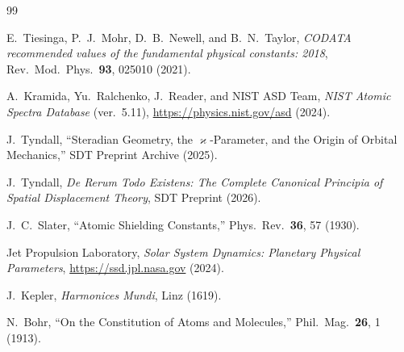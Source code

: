 \documentclass[twocolumn,epjc3]{svjour3}
\newcommand{\kop}{\varkappa}  %
\begin{document}
\begin{thebibliography}{99}

E.~Tiesinga, P.~J.~Mohr, D.~B.~Newell, and B.~N.~Taylor,
\emph{CODATA recommended values of the fundamental physical constants: 2018},
Rev.\ Mod.\ Phys.\ \textbf{93}, 025010 (2021).

A.~Kramida, Yu.~Ralchenko, J.~Reader, and NIST ASD Team,
\emph{NIST Atomic Spectra Database} (ver.\ 5.11),
\url{https://physics.nist.gov/asd} (2024).

J.~Tyndall,
``Steradian Geometry, the $\kop$-Parameter, and the Origin of Orbital Mechanics,''
SDT Preprint Archive (2025).

J.~Tyndall,
\emph{De Rerum Todo Existens: The Complete Canonical Principia of Spatial Displacement Theory},
SDT Preprint (2026).

J.~C.~Slater,
``Atomic Shielding Constants,''
Phys.\ Rev.\ \textbf{36}, 57 (1930).

Jet Propulsion Laboratory,
\emph{Solar System Dynamics: Planetary Physical Parameters},
\url{https://ssd.jpl.nasa.gov} (2024).

J.~Kepler,
\emph{Harmonices Mundi}, Linz (1619).

N.~Bohr,
``On the Constitution of Atoms and Molecules,''
Phil.\ Mag.\ \textbf{26}, 1 (1913).

\end{thebibliography}
\end{document}
